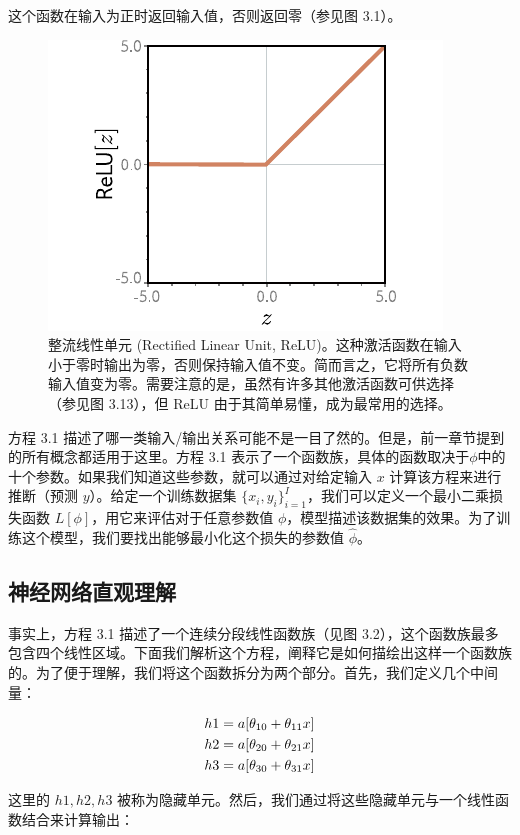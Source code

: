 \documentclass[lang=cn,newtx,10pt,scheme=chinese]{elegantbook}
\begin{document}
这个函数在输入为正时返回输入值，否则返回零（参见图 3.1）。

\begin{figure}[ht!]
	\centering
	\includegraphics[width=0.7\linewidth]{PDFFigures/UDLChap3PDF/ShallowReLU.pdf}
\caption{整流线性单元 (Rectified Linear Unit, ReLU)。这种激活函数在输入小于零时输出为零，否则保持输入值不变。简而言之，它将所有负数输入值变为零。需要注意的是，虽然有许多其他激活函数可供选择（参见图 3.13），但 ReLU 由于其简单易懂，成为最常用的选择。}
\end{figure}

方程 3.1 描述了哪一类输入/输出关系可能不是一目了然的。但是，前一章节提到的所有概念都适用于这里。方程 3.1 表示了一个函数族，具体的函数取决于\(\phi\)中的十个参数。如果我们知道这些参数，就可以通过对给定输入 \(x\) 计算该方程来进行推断（预测 \(y\)）。给定一个训练数据集 \(\{{x_i,y_i}\}^I_{i=1}\)，我们可以定义一个最小二乘损失函数 \(L[\phi]\)，用它来评估对于任意参数值 \(\phi\)，模型描述该数据集的效果。为了训练这个模型，我们要找出能够最小化这个损失的参数值 \(\hat \phi\)。


\subsection{神经网络直观理解}
事实上，方程 3.1 描述了一个连续分段线性函数族（见图 3.2），这个函数族最多包含四个线性区域。下面我们解析这个方程，阐释它是如何描绘出这样一个函数族的。为了便于理解，我们将这个函数拆分为两个部分。首先，我们定义几个中间量：


\begin{align}
	h1 = a[\theta_{10} + \theta_{11}x] \notag \\
	h2 = a[\theta_{20} + \theta_{21}x] \notag \\
	h3 = a[\theta_{30} + \theta_{31}x]  
\end{align} 

这里的 \(h1, h2, h3\) 被称为隐藏单元。然后，我们通过将这些隐藏单元与一个线性函数结合来计算输出：
\end{document}
